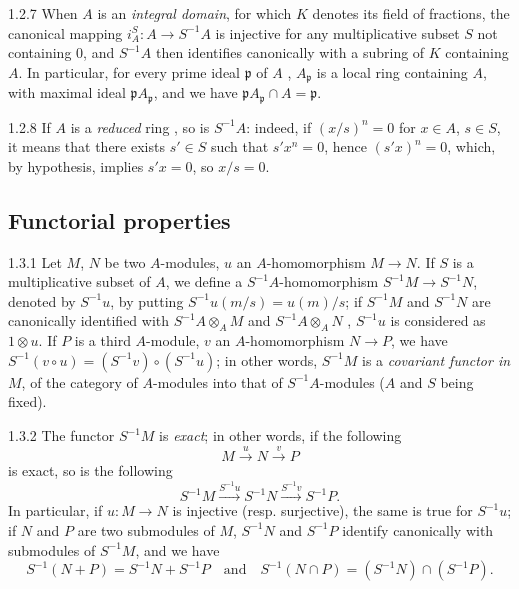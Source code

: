 \documentclass[10pt,oneside]{book}
\begin{document}
\begin{env}{1.2.7}
\label{env-0.1.2.7}
When $A$ is an \emph{integral domain}, for which $K$ denotes its field of fractions, the
canonical mapping $i_A^S:A\to S^{-1}A$ is injective for any multiplicative subset $S$ not
containing $0$, and $S^{-1}A$ then identifies canonically with a subring of $K$ containing
$A$. In particular, for every prime ideal $\mathfrak{p}$ of $A$ , $A_\mathfrak{p}$ is a local
ring containing $A$, with maximal ideal $\mathfrak{p}A_\mathfrak{p}$, and we have
$\mathfrak{p}A_\mathfrak{p}\cap A=\mathfrak{p}$.
\end{env}

\begin{env}{1.2.8}
\label{env-0.1.2.8}
If $A$ is a \emph{reduced} ring , so is $S^{-1}A$: indeed, if $(x/s)^n=0$ for
$x\in A$, $s\in S$, it means that there exists $s'\in S$ such that $s'x^n=0$, hence
$(s'x)^n=0$, which, by hypothesis, implies $s'x=0$, so $x/s=0$.
\end{env}

\subsection{Functorial properties}
\label{0-prelim-1.3}

\begin{env}{1.3.1}
\label{env-0.1.3.1}
Let $M$, $N$ be two $A$-modules, $u$ an $A$-homomorphism $M\to N$. If $S$ is a multiplicative
subset of $A$, we define a $S^{-1}A$-homomorphism $S^{-1}M\to S^{-1}N$, denoted by $S^{-1}u$,
by putting $S^{-1}u(m/s)=u(m)/s$; if $S^{-1}M$ and $S^{-1}N$ are canonically identified with
$S^{-1}A\otimes_A M$ and $S^{-1}A\otimes_A N$ , $S^{-1}u$ is considered as
$1\otimes u$. If $P$ is a third $A$-module, $v$ an $A$-homomorphism $N\to P$, we have
$S^{-1}(v\circ u)=(S^{-1}v)\circ(S^{-1}u)$; in other words, $S^{-1}M$ is a \emph{covariant
functor in} $M$, of the category of $A$-modules into that of $S^{-1}A$-modules ($A$ and $S$
being fixed).
\end{env}

\begin{env}{1.3.2}
\label{env-0.1.3.2}
The functor $S^{-1}M$ is \emph{exact}; in other words, if the following
\[
  M\xrightarrow{u}N\xrightarrow{v}P
\]
is exact, so is the following
\[
  S^{-1}M\xrightarrow{S^{-1}u}S^{-1}N\xrightarrow{S^{-1}v}S^{-1}P.
\]
In particular, if $u:M\to N$ is injective (resp. surjective), the same is true for $S^{-1}u$;
if $N$ and $P$ are two submodules of $M$, $S^{-1}N$ and $S^{-1}P$ identify canonically with
submodules of $S^{-1}M$, and we have
\[
  S^{-1}(N+P)=S^{-1}N+S^{-1}P\quad\text{and}\quad S^{-1}(N\cap P)=(S^{-1}N)\cap(S^{-1}P).
\]
\end{env}
\end{document}
